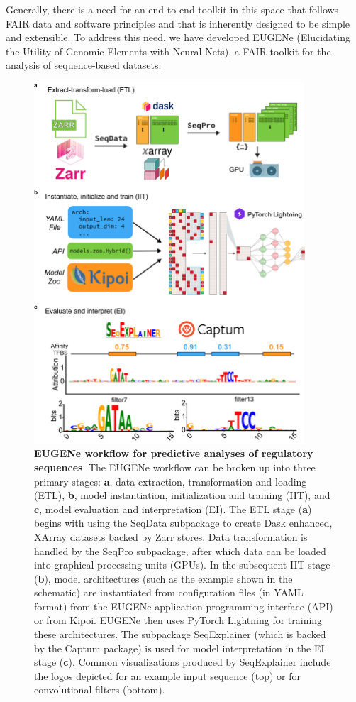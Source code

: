 Generally, there is a need for an end-to-end toolkit in this space that follows FAIR data and software principles\cite{Barker2022-on} and that is inherently designed to be simple and extensible. To address this need, we have developed EUGENe (Elucidating the Utility of Genomic Elements with Neural Nets), a FAIR toolkit for the analysis of sequence-based datasets. 

\begin{figure}[p]
    \centering
    \includegraphics[width=0.9\textwidth, height=0.745\textheight]{1_figures-and-files/figure1.png}
    \caption[EUGENe workflow overview]{\textbf{EUGENe workflow for predictive analyses of regulatory sequences}. The EUGENe workflow can be broken up into three primary stages: \textbf{a}, data extraction, transformation and loading (ETL), \textbf{b}, model instantiation, initialization and training (IIT), and \textbf{c}, model evaluation and interpretation (EI). The ETL stage (\textbf{a}) begins with using the SeqData subpackage to create Dask enhanced, XArray datasets backed by Zarr stores. Data transformation is handled by the SeqPro subpackage, after which data can be loaded into graphical processing units (GPUs). In the subsequent IIT stage (\textbf{b}), model architectures (such as the example shown in the schematic) are instantiated from configuration files (in YAML format) from the EUGENe application programming interface (API) or from Kipoi. EUGENe then uses PyTorch Lightning for training these architectures. The subpackage SeqExplainer (which is backed by the Captum package) is used for model interpretation in the EI stage (\textbf{c}). Common visualizations produced by SeqExplainer include the logos depicted for an example input sequence (top) or for convolutional filters (bottom).}
    \label{fig:1 Figure 1}
\end{figure}


